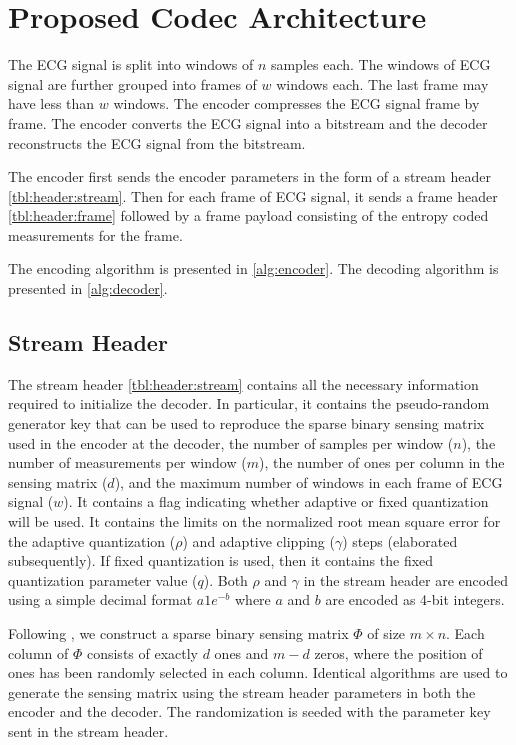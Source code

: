 \section{Proposed Codec Architecture}
\label{sec:arch}

The ECG signal is split into windows
of $n$ samples each. The windows of
ECG signal are further grouped into
frames of $w$ windows each. The
last frame may have less than $w$
windows.
The encoder compresses the ECG signal
frame by frame.
The encoder converts the
ECG signal into a bitstream and the
decoder reconstructs the ECG signal
from the bitstream.

The encoder first sends
the encoder parameters in the form
of a stream header \cref{tbl:header:stream}.
Then for each frame of ECG signal,
it sends a frame header \cref{tbl:header:frame}
followed by a frame payload consisting of the
entropy coded measurements for the frame.

The encoding algorithm is presented in
\cref{alg:encoder}.
The decoding algorithm is presented in
\cref{alg:decoder}.

\subsection{Stream Header}
The stream header \cref{tbl:header:stream}
contains all the necessary information
required to initialize the decoder.
In particular, it contains the pseudo-random
generator key that can be used to reproduce
the sparse binary sensing matrix used in the
encoder at the decoder,
the number of samples per window ($n$),
the number of measurements per window ($m$),
the number of ones per column in the sensing matrix
($d$),
and the maximum number of windows in each frame
of ECG signal ($w$).
It contains a flag indicating whether adaptive
or fixed quantization will be used.
It contains the limits on the normalized
root mean square error for
the adaptive quantization ($\rho$)
and adaptive clipping ($\gamma$) steps (elaborated subsequently).
If fixed quantization is used, then it contains
the fixed quantization parameter value ($q$).
Both $\rho$ and $\gamma$ in the stream header
are encoded using a simple decimal format $a 1e^{-b}$ where $a$
and $b$ are encoded as 4-bit integers.

Following \cite{mamaghanian2011compressed},
we construct a sparse binary sensing matrix $\Phi$ of size
$m \times n$.
Each column of $\Phi$ consists of exactly $d$ ones and
$m-d$ zeros, where the position of ones has been randomly
selected in each column. Identical algorithms are used
to generate the sensing matrix using the stream header
parameters in both the encoder and the decoder.
The randomization is seeded with the parameter $\mathrm{key}$
sent in the stream header.

